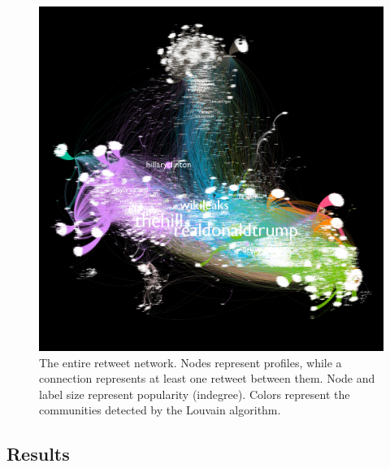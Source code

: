 \documentclass[12pt, titlepage=true, toc=bib]{scrartcl}
\begin{document}
\begin{figure}[!ht]
\centering
\includegraphics[width=0.95\linewidth]{Network_modularity.png}
\caption{The entire retweet network. Nodes represent profiles, while a connection represents at least one retweet between them. Node and label size represent popularity (indegree). Colors represent the communities detected by the Louvain algorithm.}
\label{fig:graph}
\end{figure}


\subsection{Results}
\end{document}

